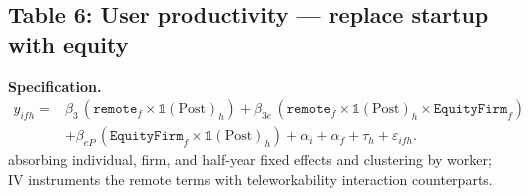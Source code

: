 \documentclass{article}
\newcommand{\cleanedresultsdir}{../../results/cleaned/tex}
\newcommand{\TableInput}[2][\linewidth]{}
\newcommand{\FloatNote}[1]{%
  \begingroup
    \captionsetup{style=noteflush}%
    \caption*{\textit{Notes:}~#1}%
  \endgroup
}
\begin{document}
\subsection*{Table 6: User productivity --- replace startup with equity}
\noindent \textbf{Specification.}
\begin{equation*}
\begin{aligned}
  y_{ifh} ={}&
  \beta_3\,(\texttt{remote}_f\times \mathds{1}(\text{Post})_h)
  + \beta_{3e}\,(\texttt{remote}_f\times \mathds{1}(\text{Post})_h\times \texttt{EquityFirm}_f) \\
  &+ \beta_{eP}\,(\texttt{EquityFirm}_f\times \mathds{1}(\text{Post})_h)
  + \alpha_i + \alpha_f + \tau_h + \varepsilon_{ifh}.
\end{aligned}
\end{equation*}
absorbing individual, firm, and half-year fixed effects and clustering by worker; IV instruments the remote terms with teleworkability interaction counterparts.
\begin{table}[H]\centering
  \caption{User productivity: replace startup with equity}
  \TableInput{\cleanedresultsdir/llm_equity_pi_followups_reduced1_user.tex}
  \FloatNote{Column and row interpretation matches Table 5, but on the user panel. In particular, the post remote effect for equity firms is the sum of the $\texttt{Remote}\times\mathds{1}(\text{Post})$ row and the $\texttt{Remote}\times\mathds{1}(\text{Post})\times\texttt{EquityFirm}$ row. Standard errors are clustered by worker and reported in parentheses; *, **, *** denote $p<0.10, 0.05, 0.01$.}
\end{table}
\end{document}
